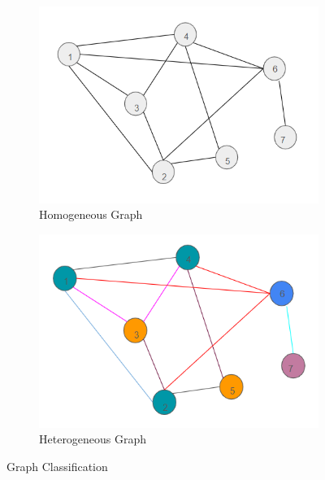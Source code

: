 \documentclass{report} %
\begin{document}
\begin{figure}[H]
    \centering
    \begin{subfigure}{0.35\textwidth}
        \centering
        \includegraphics[width=\textwidth]{./ReportImages/HomogeneousGraph.png}
        \caption{Homogeneous Graph} 
        \label{fig:Homogeneous Graph}
    \end{subfigure}
    \begin{subfigure}{0.35\textwidth}
        \centering
        \includegraphics[width=\textwidth]{./ReportImages/HeterogeneousGraph.png}
        \caption{Heterogeneous Graph}
        \label{fig:Heterogeneous Graph}
    \end{subfigure}
    \caption{Graph Classification}
    \label{fig:Graph Classification}
\end{figure}
\end{document}
